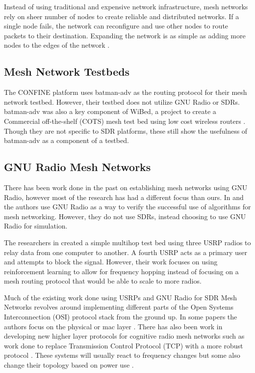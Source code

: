 Instead of using traditional and expensive network infrastructure, mesh networks rely on sheer number of nodes to create reliable and distributed networks. If a single node fails, the network can reconfigure and use other nodes to route packets to their destination. Expanding the network is as simple as adding more nodes to the edges of the network \cite{6908725}. 

\subsection{Mesh Network Testbeds}

The CONFINE platform uses batman-adv as the routing protocol for their mesh network testbed. However, their testbed does not utilize GNU Radio or SDRs. \cite{0001} batman-adv was also a key component of WiBed, a project to create a Commercial off-the-shelf (COTS) mesh test bed using low cost wireless routers \cite{6686492} \cite{6962154}. Though they are not specific to SDR platforms, these still show the usefulness of batman-adv as a component of a testbed. 

\subsection{GNU Radio Mesh Networks}

There has been work done in the past on establishing mesh networks using GNU Radio, however most of the research has had a different focus than ours. In \cite{4509617} and \cite{5062250} the authors use GNU Radio as a way to verify the successful use of algorithms for mesh networking. However, they do not use SDRs, instead choosing to use GNU Radio for simulation. 

The researchers in \cite{7141228} created a simple multihop test bed using three USRP radios to relay data from one computer to another. A fourth USRP acts as a primary user and attempts to block the signal. However, their work focuses on using reinforcement learning to allow for frequency hopping instead of focusing on a mesh routing protocol that would be able to scale to more radios. 

Much of the existing work done using USRPs and GNU Radio for SDR Mesh Networks revolves around implementing different parts of the Open Systems Interconnection (OSI) protocol stack from the ground up. In some papers the authors focus on the physical or mac layer \cite{5508221}. There has also been work in developing new higher layer protocols for cognitive radio mesh networks such as work done to replace Transmission Control Protocol (TCP) with a more robust protocol \cite{6686523}. These systems will usually react to frequency changes but some also change their topology based on power use \cite{6983150}.

